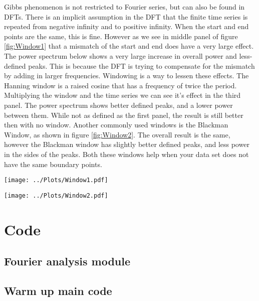 \documentclass[twocolumn]{myarticle}
\begin{document}
Gibbs phenomenon is not restricted to Fourier series, but can also be found in DFTs. 
There is an implicit assumption in the DFT that the finite time series is repeated from negative infinity and to positive infinity. 
When the start and end points are the same, this is fine. 
However as we see in middle panel of figure \ref{fig:Window1} that a mismatch of the start and end does have a very large effect. 
The power spectrum below shows a very large increase in overall power and less-defined peaks. 
This is because the DFT is trying to compensate for the mismatch by adding in larger frequencies. 
Windowing is a way to lessen these effects. 
The Hanning window is a raised cosine that has a frequency of twice the period. 
Multiplying the window and the time series we can see it's effect in the third panel. 
The power spectrum shows better defined peaks, and a lower power between them. 
While not as defined as the first panel, the result is still better then with no window. 
Another commonly used windows is the Blackman Window, as shown in figure \ref{fig:Window2}. 
The overall result is the same, however the Blackman window has slightly better defined peaks, and less power in the sides of the peaks. 
Both these windows help when your data set does not have the same boundary points.

\begin{figure*}[htpb]
    \centering
    \texttt{[image: ../Plots/Window1.pdf]}
    \caption{%
        Looking at the Hanning window. The top resents the time series of a plain sine wave, a sine wave that is not periodic in the interval, and the effect of the Hanning window on the non-periodic wave. The bottom displays the corresponding power spectra.
    }
    \label{fig:Window1}
\end{figure*}

\begin{figure*}[htpb]
    \centering
    \texttt{[image: ../Plots/Window2.pdf]}
    \caption{%
        Looking at the Blackman window. The top resents the time series of a plain sine wave, a sine wave that is not periodic in the interval, and the effect of the Hanning window on the non-periodic wave. The bottom displays the corresponding power spectra.
    }
    \label{fig:Window2}
\end{figure*}

\onecolumn

\section{Code}
\label{sec:code}

\subsection{Fourier analysis module}
\label{subsec:fourier_analysis_module}


\vspace{10pt}

\subsection{Warm up main code}
\label{subsec:warm_up_main_code}


\vspace{10pt}
\end{document}
